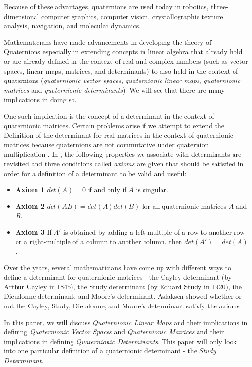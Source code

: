 Because of these advantages, quaternions are used today in robotics, three-dimensional computer graphics, computer vision, crystallographic texture analysis, navigation, and molecular dynamics. 

Mathematicians have made advancements in developing the theory of Quaternions especially in extending concepts in linear algebra that already hold or are already defined in the context of real and complex numbers (such as vector spaces, linear maps, matrices, and determinants) to also hold in the context of quaternions (\emph{quaternionic vector spaces}, \emph{quaternionic linear maps}, \emph{quaternionic matrices} and \emph{quaternionic determinants}). We will see that there are many implications in doing so.

One such implication is the concept of a determinant in the context of quaternionic matrices. Certain problems arise if we attempt to extend the Definition of the determinant for real matrices in the context of quaternionic matrices because quaternions are not commutative under quaternion multiplication \cite{aslaksen}. In \cite{aslaksen}, the following properties we associate with determinants are revisited and three conditions called \emph{axioms} are given that should be satisfied in order for a definition of a determinant to be valid and useful:
\begin{itemize}
	\item \textbf{Axiom 1} $det(A) = 0$ if and only if $A$ is singular.
	\item \textbf{Axiom 2} $det(AB) = det(A)det(B)$ for all quaternionic matrices $A$ and $B$.
	\item \textbf{Axiom 3} If $A'$ is obtained by adding a left-multiple of a row to another row or a right-multiple of a column to another column, then $det(A')=det(A)$.
\end{itemize}

Over the years, several mathematicians have come up with different ways to define a determinant for quaternionic matrices - the Cayley determinant (by Arthur Cayley in 1845), the Study determinant (by Eduard Study in 1920), the Dieudonne determinant, and Moore's determinant. Aslaksen showed whether or not the Cayley, Study, Dieudonne, and Moore's determinant satisfy the axioms \cite{aslaksen}.

In this paper, we will discuss \emph{Quaternionic Linear Maps} and their implications in defining \emph{Quaternionic Vector Spaces} and \emph{Quaternionic Matrices} and their implications in defining \emph{Quaternionic Determinants}. This paper will only look into one particular definition of a quaternionic determinant - the \emph{Study Determinant}.
\iffalse
We will then use the Study determinant to extend a result in \cite{stamaria} to the set of all skew-coninvolutory quaternionic matrices, i.e., we will show that the set of all $n \times n$ skew-coninvolutory quaternionic matrices is empty when $n$ is odd. 
\fi
\newpage
